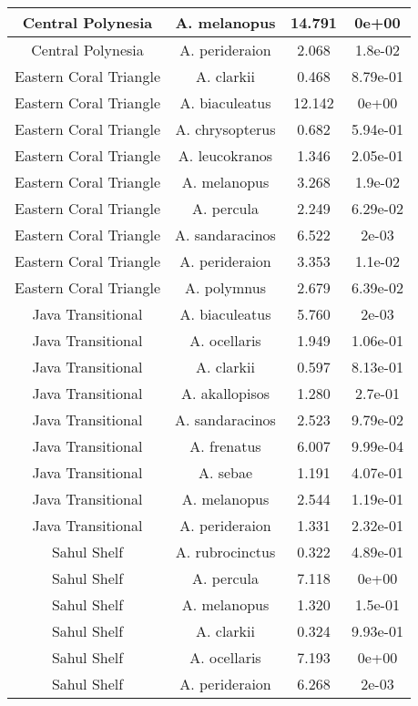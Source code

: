 \begin{table}[!h]
\begin{tabular}[t]{c|c|c|c}
\hline
Central Polynesia & A. melanopus & 14.791 & 0e+00\\
\hline
Central Polynesia & A. perideraion & 2.068 & 1.8e-02\\
\hline
Eastern Coral Triangle & A. clarkii & 0.468 & 8.79e-01\\
\hline
Eastern Coral Triangle & A. biaculeatus & 12.142 & 0e+00\\
\hline
Eastern Coral Triangle & A. chrysopterus & 0.682 & 5.94e-01\\
\hline
Eastern Coral Triangle & A. leucokranos & 1.346 & 2.05e-01\\
\hline
Eastern Coral Triangle & A. melanopus & 3.268 & 1.9e-02\\
\hline
Eastern Coral Triangle & A. percula & 2.249 & 6.29e-02\\
\hline
Eastern Coral Triangle & A. sandaracinos & 6.522 & 2e-03\\
\hline
Eastern Coral Triangle & A. perideraion & 3.353 & 1.1e-02\\
\hline
Eastern Coral Triangle & A. polymnus & 2.679 & 6.39e-02\\
\hline
Java Transitional & A. biaculeatus & 5.760 & 2e-03\\
\hline
Java Transitional & A. ocellaris & 1.949 & 1.06e-01\\
\hline
Java Transitional & A. clarkii & 0.597 & 8.13e-01\\
\hline
Java Transitional & A. akallopisos & 1.280 & 2.7e-01\\
\hline
Java Transitional & A. sandaracinos & 2.523 & 9.79e-02\\
\hline
Java Transitional & A. frenatus & 6.007 & 9.99e-04\\
\hline
Java Transitional & A. sebae & 1.191 & 4.07e-01\\
\hline
Java Transitional & A. melanopus & 2.544 & 1.19e-01\\
\hline
Java Transitional & A. perideraion & 1.331 & 2.32e-01\\
\hline
Sahul Shelf & A. rubrocinctus & 0.322 & 4.89e-01\\
\hline
Sahul Shelf & A. percula & 7.118 & 0e+00\\
\hline
Sahul Shelf & A. melanopus & 1.320 & 1.5e-01\\
\hline
Sahul Shelf & A. clarkii & 0.324 & 9.93e-01\\
\hline
Sahul Shelf & A. ocellaris & 7.193 & 0e+00\\
\hline
Sahul Shelf & A. perideraion & 6.268 & 2e-03\\

\end{tabular}
\end{table}

